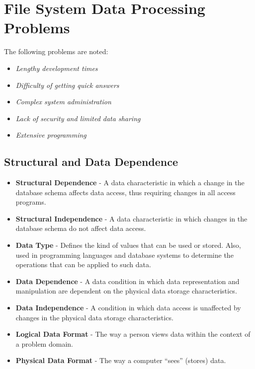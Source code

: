 \documentclass[a4paper, 12pt, titlepage]{report}
\begin{document}
\section{File System Data Processing Problems}
The following problems are noted:
\begin{itemize}
\item \emph{Lengthy development times}
\item \emph{Difficulty of getting quick answers}
\item \emph{Complex system administration}
\item \emph{Lack of security and limited data sharing}
\item \emph{Extensive programming}
\end{itemize}

\subsection{Structural and Data Dependence}
\begin{itemize}
\item \textbf{Structural Dependence} - A data characteristic in which a change in the database schema affects data access, thus requiring changes in all access programs. 
\item \textbf{Structural Independence} - A data characteristic in which changes in the database schema do not affect data access.
\item \textbf{Data Type} - Defines the kind of values that can be used or stored. Also, used in programming languages and database systems to determine the operations that can be applied to such data.
\item \textbf{Data Dependence} - A data condition in which data representation and manipulation are dependent on the physical data storage characteristics.
\item \textbf{Data Independence} - A condition in which data access is unaffected by changes in the physical data storage characteristics. 
\item \textbf{Logical Data Format} - The way a person views data within the context of a problem domain.
\item \textbf{Physical Data Format} - The way a computer “sees” (stores) data.
\end{itemize}
\end{document}
